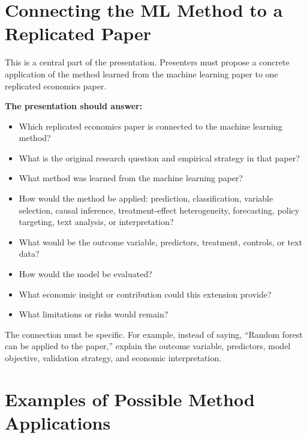\documentclass[11pt]{article}
\newcommand{\coloredsection}[1]{\vspace{2pt}\section*{\large\textcolor{sectioncolor}{#1}}\vspace{-2pt}}
\newcommand{\subhead}[1]{\vspace{4pt}\noindent\textbf{#1}}
\begin{document}
\coloredsection{Connecting the ML Method to a Replicated Paper}

This is a central part of the presentation. Presenters must propose a concrete application of the method learned from the machine learning paper to one replicated economics paper.

\subhead{The presentation should answer:}
\begin{itemize}
    \item Which replicated economics paper is connected to the machine learning method?
    \item What is the original research question and empirical strategy in that paper?
    \item What method was learned from the machine learning paper?
    \item How would the method be applied: prediction, classification, variable selection, causal inference, treatment-effect heterogeneity, forecasting, policy targeting, text analysis, or interpretation?
    \item What would be the outcome variable, predictors, treatment, controls, or text data?
    \item How would the model be evaluated?
    \item What economic insight or contribution could this extension provide?
    \item What limitations or risks would remain?
\end{itemize}

\noindent The connection must be specific. For example, instead of saying, ``Random forest can be applied to the paper,'' explain the outcome variable, predictors, model objective, validation strategy, and economic interpretation.

\coloredsection{Examples of Possible Method Applications}
\end{document}
